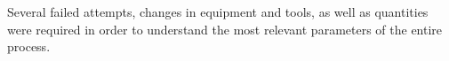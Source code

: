 \documentclass{article}
\begin{document}
        Several failed attempts, changes in equipment and tools, as well as quantities were required in order 
        to understand the most relevant parameters of the entire process. 

        \clearpage
%
%
%
%
\end{document}
